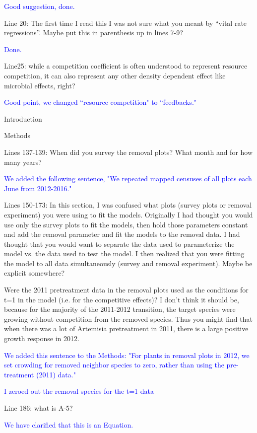 \documentclass[12pt]{article}
\newcommand{\response}{\textcolor{blue}}
\begin{document}
\response{Good suggestion, done.}

Line 20: The first time I read this I was not sure what you meant by “vital rate regressions”. Maybe put this in parenthesis up in lines 7-9?

\response{Done.}

Line25: while a competition coefficient is often understood to represent resource competition, it can also represent any other density dependent effect like microbial effects, right?

\response{Good point, we changed ``resource competition" to ``feedbacks."}

Introduction

Methods

Lines 137-139:  When did you survey the removal plots? What month and for how many years? 

\response{We added the following sentence, "We repeated mapped censuses of all plots each June from 2012-2016."}

Lines 150-173: In this section, I was confused what plots (survey plots or removal experiment) you were using to fit the models. Originally I had thought you would use only the survey plots to fit the models, then hold those parameters constant and add the removal parameter and fit the models to the removal data. I had thought that you would want to separate the data used to parameterize the model vs. the data used to test the model. I then realized that you were fitting the model to all data simultaneously (survey and removal experiment). Maybe be explicit somewhere? 

Were the 2011 pretreatment data in the removal plots used as the conditions for t=1 in the model (i.e. for the competitive effects)? I don’t think it should be, because for the majority of the 2011-2012 transition, the target species were growing without competition from the removed species. Thus you might find that when there was a lot of Artemisia pretreatment in 2011, there is a large positive growth response in 2012.

\response{We added this sentence to the Methods: "For plants in removal plots in 2012, we set crowding for removed neighbor species to zero, rather than using the pre-treatment (2011) data."}

\response{I zeroed out the removal species for the t=1 data}

Line 186: what is A-5?

\response{We have clarified that this is an Equation.}
\end{document}

